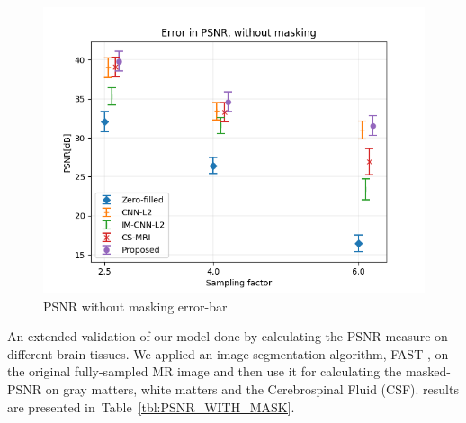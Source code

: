 \documentclass[review]{elsarticle}
\begin{document}
\begin{figure}[H]
\centering
\includegraphics[width=0.7\linewidth]{include/grp2/error_psnr_errorbar}
\caption{PSNR without masking error-bar}
\end{figure}\label{fig:error_psnr_errorbar}

An extended validation of our model done by calculating the PSNR measure on different brain tissues. We applied an image segmentation algorithm, FAST \cite{zhang2001segmentation}, on the original fully-sampled MR image and then use it for calculating the masked-PSNR on gray matters, white matters and the Cerebrospinal Fluid (CSF). results are presented in~Table~\ref{tbl:PSNR_WITH_MASK}.


\end{document}
